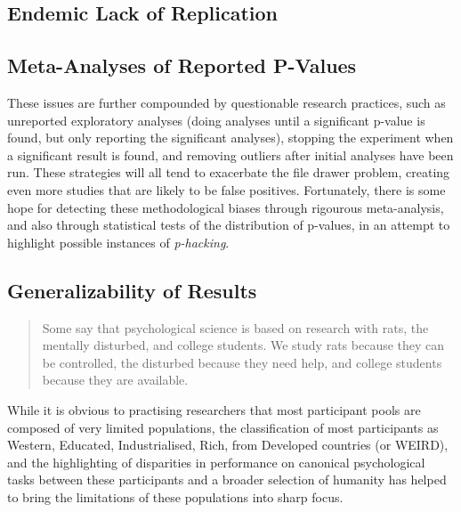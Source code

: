 \documentclass[12pt,a4paper,titlepage]{scrreprt}
\begin{document}
\subsection{Endemic Lack of Replication}
\subsection{Meta-Analyses of Reported P-Values}
These issues are further compounded by questionable research practices\cite{john_measuring_2012}, such as unreported exploratory analyses (doing analyses until a significant p-value is found, but only reporting the significant analyses), stopping the experiment when a significant result is found, and removing outliers after initial analyses have been run. These strategies will all tend to exacerbate the file drawer problem, creating even more studies that are likely to be false positives\cite{bakker_rules_2012}. Fortunately, there is some hope for detecting these methodological biases through rigourous meta-analysis, and also through statistical tests of the distribution of p-values, in an attempt to highlight possible instances of \textit{p-hacking}\cite{simonsohn_p-curve:_2013}.
\subsection{Generalizability of Results}
\begin{quote}Some say that psychological science is based on research with rats, the mentally disturbed, and college students. We study rats because they can be controlled, the disturbed because they need help, and college students because they are available.\cite{birnbaum_psychological_2000}
\end{quote}
While it is obvious to practising researchers that most participant pools are composed of very limited populations\cite{buchanan_using_1999}\cite{birnbaum_psychological_2000}\cite{kraut_psychological_2004}\cite{birnbaum_human_2004}\cite{buhrmester_amazons_2011}, the classification of most participants as Western, Educated, Industrialised, Rich, from Developed countries (or WEIRD), and the highlighting of disparities in performance on canonical psychological tasks between these participants and a broader selection of humanity \cite{henrich_beyond_2010} has helped to bring the limitations of these populations into sharp focus.
\end{document}
